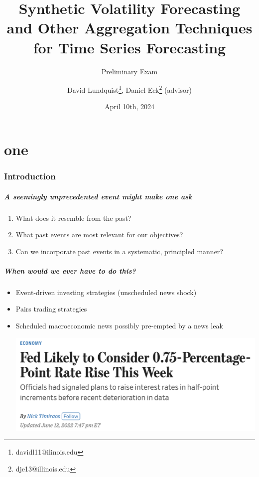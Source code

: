 \documentclass[9pt]{beamer}
\title{Synthetic Volatility Forecasting and Other Aggregation Techniques for Time Series Forecasting}
\subtitle{Preliminary Exam}
\author{David Lundquist\thanks{davidl11@ilinois.edu}, Daniel Eck\thanks{dje13@illinois.edu} (advisor)}
\date{April 10th, 2024}
\theoremstyle{definition}
\begin{document}
\part{one}
\begin{frame}
\titlepage
\end{frame}

\section{Introduction}

\begin{frame}
\frametitle{A seemingly unprecedented event might make one ask}
\begin{enumerate}
    \item <1-> What does it resemble from the past?
    \item <2-> What past events are most relevant for our objectives?
    \item <3-> Can we incorporate past events in a systematic, principled manner?
\end{enumerate}
\end{frame}

\begin{frame}
    \frametitle{When would we ever have to do this?}

    \begin{itemize}
        \item <1-> Event-driven investing strategies (unscheduled news shock)
        \item <2-> Pairs trading strategies
        \item <3-> Scheduled macroeconomic news possibly pre-empted by a news leak
        

        \href{https://www.wsj.com/articles/bad-inflation-reports-raise-odds-of-surprise-0-75-percentage-point-rate-rise-this-week-11655147927}{\includegraphics[scale=.3]{WSJ_rate_hike_2022.png}}
    \end{itemize}
\end{frame}
\end{document}
